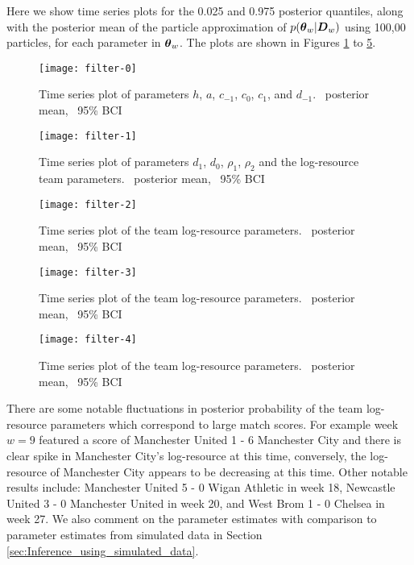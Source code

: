 Here we show time series plots for the 0.025 and 0.975 posterior quantiles, along with the posterior mean of the
particle approximation of \(p(\boldsymbol{\theta}_w | \boldsymbol{D}_w)\) using 100,00 particles, for each parameter in \(\boldsymbol{\theta}_w\).
The plots are shown in Figures \ref{fig:filter-0} to \ref{fig:filter-4}.
\begin{figure}[htp]
\begin{center}
\texttt{[image: filter-0]}
\caption{Time series plot of parameters \(h\), \(a\), \(c_{-1}\), \(c_0\), \(c_{1}\), and \(d_{-1}\).
\protect\redSolidLine\ posterior mean, \protect\blackDashedLine\ 95\% BCI}
\label{fig:filter-0}
\end{center}
\end{figure}
%
\begin{figure}[htp]
\begin{center}
\texttt{[image: filter-1]}
\caption{Time series plot of parameters \(d_{1}\), \(d_0\), \(\rho_1\), \(\rho_2\) and the log-resource team
parameters. \protect\redSolidLine\ posterior mean, \protect\blackDashedLine\ 95\% BCI}
\label{fig:filter-1}
\end{center}
\end{figure}
%
\begin{figure}[htp]
\begin{center}
\texttt{[image: filter-2]}
\caption{Time series plot of the team log-resource parameters. \protect\redSolidLine\ posterior mean,
\protect\blackDashedLine\ 95\% BCI}
\label{fig:filter-2}
\end{center}
\end{figure}
%
\begin{figure}[htp]
\begin{center}
\texttt{[image: filter-3]}
\caption{Time series plot of the team log-resource parameters. \protect\redSolidLine\ posterior mean,
\protect\blackDashedLine\ 95\% BCI}
\label{fig:filter-3}
\end{center}
\end{figure}
%
\begin{figure}[htp]
\begin{center}
\texttt{[image: filter-4]}
\caption{Time series plot of the team log-resource parameters. \protect\redSolidLine\ posterior mean,
\protect\blackDashedLine\ 95\% BCI}
\label{fig:filter-4}
\end{center}
\end{figure}

There are some notable fluctuations in posterior probability of the team log-resource parameters which correspond to
large match scores. For example week \(w = 9\) featured a score of Manchester United 1 - 6 Manchester City and there is
clear spike in Manchester City's log-resource at this time, conversely, the log-resource of Manchester City appears to
be decreasing at this time. Other notable results include: Manchester United 5 - 0 Wigan Athletic in week 18, Newcastle
United 3 - 0 Manchester United in week 20, and West Brom 1 - 0 Chelsea in week 27. We also comment on the parameter
estimates with comparison to parameter estimates from simulated data in Section
\ref{sec:Inference_using_simulated_data}.

